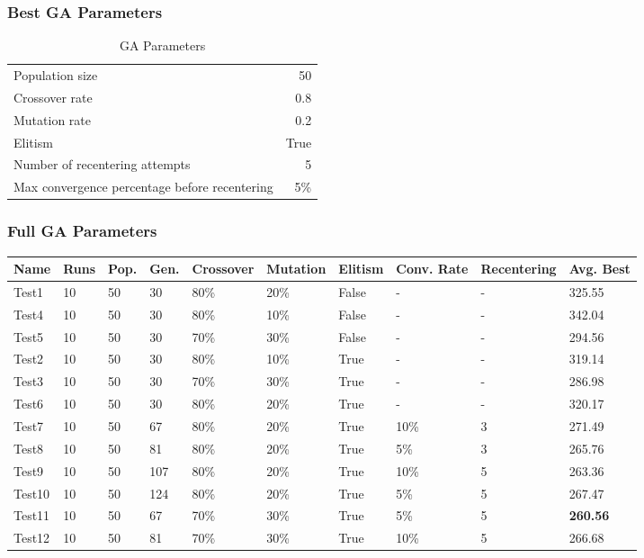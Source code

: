 \documentclass[]{beamer}
\begin{document}
\begin{frame}
  \frametitle{Best GA Parameters}

  \begin{table}[htp]
  \caption{GA Parameters}
  \centering
  \begin{tabular}{ l r }
    \hline
      Population size & 50 \\
      Crossover rate & 0.8 \\
      Mutation rate & 0.2 \\
      Elitism & True \\
      Number of recentering attempts & 5 \\
      Max convergence percentage before recentering & 5\% \\
    \hline
  \end{tabular}
  \end{table}

\end{frame}

\begin{frame}
  \frametitle{Full GA Parameters}


  \begin{table}[t]
  \tiny
  \begin{tabular}{ | l | l | l | l | l | l | l | l | l | l | }
    \hline
    Name & Runs & Pop. & Gen. & Crossover & Mutation & Elitism & Conv. Rate & Recentering &  Avg. Best \\ \hline \hline
    Test1 & 10 & 50 & 30 & 80\% & 20\% & False & - & - & 325.55 \\ \hline
    Test4 & 10 & 50 & 30 & 80\% & 10\% & False & - & - & 342.04 \\ \hline
    Test5 & 10 & 50 & 30 & 70\% & 30\% & False & - & - & 294.56 \\ \hline
    Test2 & 10 & 50 & 30 & 80\% & 10\% & True & - & - & 319.14 \\ \hline
    Test3 & 10 & 50 & 30 & 70\% & 30\% & True & - & - & 286.98 \\ \hline
    Test6 & 10 & 50 & 30 & 80\% & 20\% & True & - & - & 320.17 \\ \hline
    Test7 & 10 & 50 & 67 & 80\% & 20\% & True & 10\% & 3 & 271.49 \\ \hline
    Test8 & 10 & 50 & 81 & 80\% & 20\% & True & 5\% & 3 & 265.76 \\ \hline
    Test9 & 10 & 50 & 107 & 80\% & 20\% & True & 10\% & 5 & 263.36 \\ \hline
    Test10 & 10 & 50 & 124 & 80\% & 20\% & True & 5\% & 5 & 267.47 \\ \hline
    Test11 & 10 & 50 & 67 & 70\% & 30\% & True & 5\% & 5 & \textbf{260.56} \\ \hline
    Test12 & 10 & 50 & 81 & 70\% & 30\% & True & 10\% & 5 & 266.68 \\ \hline
  \end{tabular}
  \end{table}

\end{frame}
\end{document}
